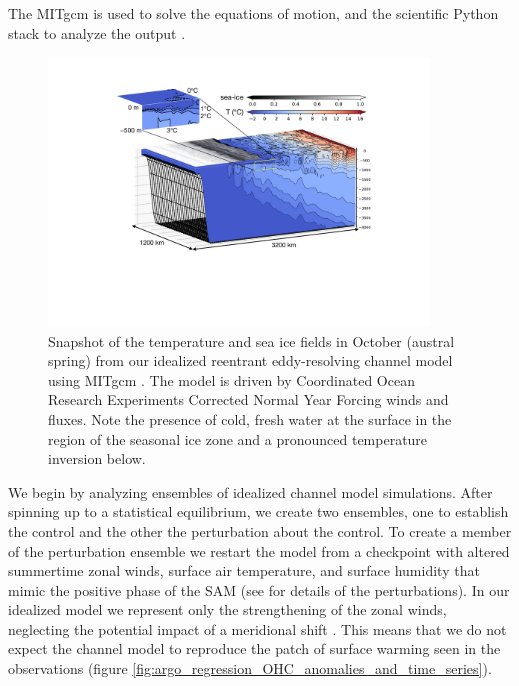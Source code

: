 \documentclass{ametsocV5}
\begin{document}
The MITgcm \citep{Marshall1997,Marshall1997b} is used to solve the equations of motion, and the scientific Python stack to analyze the output \citep{Hoyer2017,Hunter2007,Kluyver2016,Perez2007,VanDerWalt2011}.


\begin{figure}[!ht]
    \begin{center}
        \includegraphics[width=0.9\textwidth]{figures/T_snapshot_3D.pdf}
        \caption{Snapshot of the temperature and sea ice fields in October (austral spring) from our idealized reentrant eddy-resolving channel model using MITgcm \citep{Marshall1997,Marshall1997b}. The model is driven by Coordinated Ocean Research Experiments Corrected Normal Year Forcing winds and fluxes. Note the presence of cold, fresh water at the surface in the region of the seasonal ice zone and a pronounced temperature inversion below.}
        \label{fig:T_snapshot_3D}
    \end{center}
\end{figure}


We begin by analyzing ensembles of idealized channel model simulations. After spinning up to a statistical equilibrium, we create two ensembles, one to establish the control and the other the perturbation about the control. To create a member of the perturbation ensemble we restart the model from a checkpoint with altered summertime zonal winds, surface air temperature, and surface humidity that mimic the positive phase of the SAM (see \citet{Doddridge2019a} for details of the perturbations). In our idealized model we represent only the strengthening of the zonal winds, neglecting the potential impact of a meridional shift \citep[c.f.][]{Waugh2019}. This means that we do not expect the channel model to reproduce the patch of surface warming seen in the observations (figure \ref{fig:argo_regression_OHC_anomalies_and_time_series}).
\end{document}

